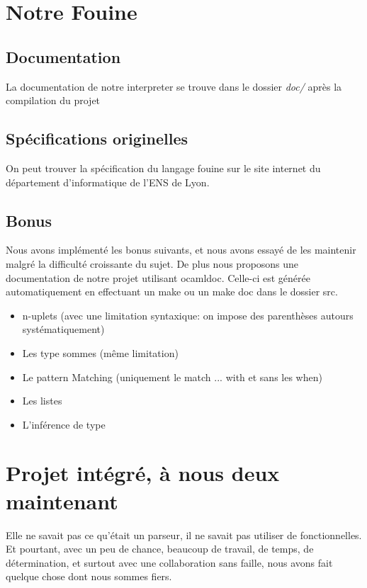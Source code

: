 \documentclass{article}
\begin{document}
	\section{Notre Fouine}
	
	\subsection{Documentation}
	
	La documentation de notre interpreter se trouve dans le dossier \emph{doc/} après la compilation du projet
	
	\subsection{Spécifications originelles}
	
	On peut trouver la spécification du langage fouine sur le site internet du département d'informatique de l'ENS de Lyon\cite{di:fouine}.
	
	\subsection{Bonus}
	
	Nous avons implémenté les bonus suivants, et nous avons essayé de les maintenir malgré la difficulté croissante du sujet. De plus nous proposons une documentation de notre projet utilisant ocamldoc. Celle-ci est générée automatiquement en effectuant un make ou un make doc dans le dossier src.
	
	\begin{itemize}
		\item n-uplets (avec une limitation syntaxique: on impose des parenthèses autours systématiquement)
		\item Les type sommes (même limitation)
		\item Le pattern Matching (uniquement le match ... with et sans les when)
		\item Les listes
		\item L'inférence de type
	\end{itemize}



\section{Projet intégré, à nous deux maintenant}
	
	Elle ne savait pas ce qu'était un parseur, il ne savait pas utiliser de fonctionnelles. Et pourtant, avec un peu de chance, beaucoup de travail, de temps, de détermination, et surtout avec une collaboration sans faille, nous avons fait quelque chose dont nous sommes fiers. 
	
\end{document}
